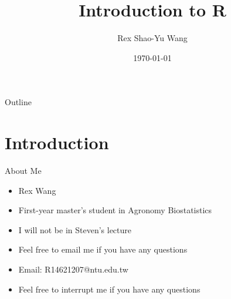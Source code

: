 \documentclass{beamer}					%
\title{Introduction to R}	%
\author{Rex Shao-Yu Wang}								%
\institute{Department of Agronomy, National Taiwan University}					%
\date{\today}									%
\begin{document}
\begin{frame}
  \titlepage
\end{frame}

\begin{frame}{Outline}
  \tableofcontents
\end{frame}

%

\section{Introduction}
\begin{frame}{About Me}
    \begin{itemize}
        \item Rex Wang 
        \item First-year master's student in Agronomy Biostatistics
        \item I will not be in Steven's lecture
        \item Feel free to email me if you have any questions  
        \item Email: R14621207@ntu.edu.tw
        \item Feel free to interrupt me if you have any questions
    \end{itemize}    
\end{frame}
\end{document}
